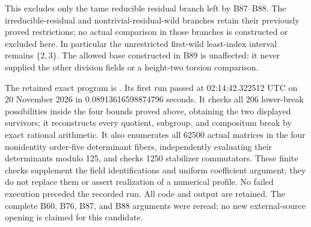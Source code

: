 \begin{remark}
\label{rem:B-RD90-scope}
This excludes only the tame reducible residual branch left
by B87--B88. The irreducible-residual and nontrivial-residual-wild
branches retain their previously proved restrictions; no
actual comparison in those branches is constructed or excluded
here. In particular the unrestricted first-wild least-index
interval remains \(\{2,3\}\). The allowed base constructed
in B89 is unaffected: it never supplied the other division
fields or a height-two torsion comparison.

The retained exact program is
.
Its first run passed at 02:14:42.322512 UTC on 20 November 2026
in 0.08913616598874796 seconds. It checks all 206 lower-break
possibilities inside the four bounds proved above, obtaining
the two displayed survivors; it reconstructs every quotient,
subgroup, and compositum break by exact rational arithmetic.
It also enumerates all 62500 actual matrices in the four
nonidentity order-five determinant fibers, independently
evaluating their determinants modulo 125, and checks 1250
stabilizer commutators. These finite checks supplement the
field identifications and uniform coefficient argument;
they do not replace them or assert realization of a numerical
profile. No failed execution preceded the recorded run.
All code and output are retained. The complete B60, B76,
B87, and B88 arguments were reread; no new external-source
opening is claimed for this candidate.
\end{remark}

